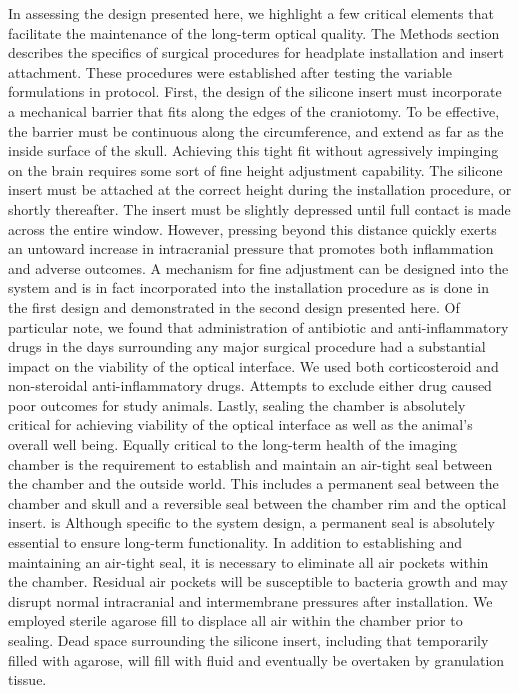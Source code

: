\documentclass[../main.tex]{subfiles}
\begin{document}
In assessing the design presented here, we highlight a few critical elements that facilitate the maintenance of the long-term optical quality.
The Methods section describes the specifics of surgical procedures for headplate installation and insert attachment.
These procedures were established after testing the variable formulations in protocol.
First, the design of the silicone insert must incorporate a mechanical barrier that fits along the edges of the craniotomy.
To be effective, the barrier must be continuous along the circumference, and extend as far as the inside surface of the skull.
Achieving this tight fit without agressively impinging on the brain requires some sort of fine height adjustment capability.
The silicone insert must be attached at the correct height during the installation procedure, or shortly thereafter.
The insert must be slightly depressed until full contact is made across the entire window.
However, pressing beyond this distance quickly exerts an untoward increase in intracranial pressure that promotes both inflammation and adverse outcomes.
A mechanism for fine adjustment can be designed into the system and is in fact incorporated into the installation procedure as is done in the first design and demonstrated in the second design presented here.
Of particular note, we found that administration of antibiotic and anti-inflammatory drugs in the days surrounding any major surgical procedure had a substantial impact on the viability of the optical interface.
We used both corticosteroid and non-steroidal anti-inflammatory drugs.
Attempts to exclude either drug caused poor outcomes for study animals.
Lastly, sealing the chamber is absolutely critical for achieving viability of the optical interface as well as the animal’s overall well being.
Equally critical to the long-term health of the imaging chamber is the requirement to establish and maintain an air-tight seal between the chamber and the outside world.
This includes a permanent seal between the chamber and skull and a reversible seal between the chamber rim and the optical insert.
is Although specific to the system design, a permanent seal is absolutely essential to ensure long-term functionality.
In addition to establishing and maintaining an air-tight seal, it is necessary to eliminate all air pockets within the chamber.
Residual air pockets will be susceptible to bacteria growth and may disrupt normal intracranial and intermembrane pressures after installation.
We employed sterile agarose fill to displace all air within the chamber prior to sealing.
Dead space surrounding the silicone insert, including that temporarily filled with agarose, will fill with fluid and eventually be overtaken by granulation tissue.
\end{document}
